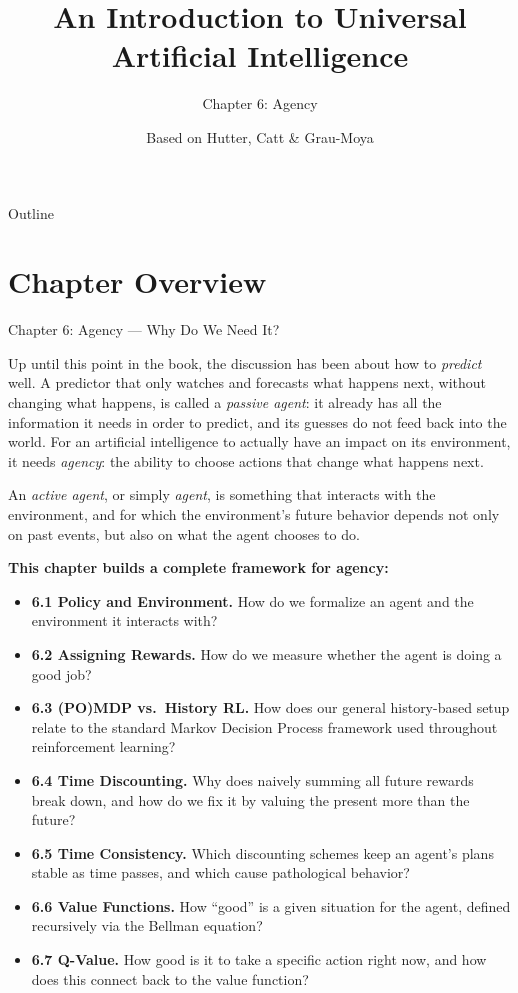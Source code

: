 \documentclass[aspectratio=169,10pt]{beamer}
\title[UAI -- Ch.6]{An Introduction to Universal Artificial Intelligence}
\subtitle{Chapter 6: Agency}
\author{Based on Hutter, Catt \& Grau-Moya}
\institute{CRC Press / Chapman \& Hall, 2024}
\date{}
\begin{document}
\begin{frame}
  \titlepage
\end{frame}

\begin{frame}{Outline}
  \tableofcontents
\end{frame}

\section{Chapter Overview}

\begin{frame}[allowframebreaks]{Chapter 6: Agency --- Why Do We Need It?}

Up until this point in the book, the discussion has been about how to
\emph{predict} well. A predictor that only watches and forecasts what
happens next, without changing what happens, is called a \emph{passive
agent}: it already has all the information it needs in order to predict,
and its guesses do not feed back into the world. For an artificial
intelligence to actually have an impact on its environment, it needs
\emph{agency}: the ability to choose actions that change what happens next.

\vspace{0.3cm}
An \emph{active agent}, or simply \emph{agent}, is something that
interacts with the environment, and for which the environment's future
behavior depends not only on past events, but also on what the agent
chooses to do.

\vspace{0.3cm}
\textbf{This chapter builds a complete framework for agency:}
\begin{itemize}
  \item \textbf{6.1 Policy and Environment.} How do we formalize an agent
    and the environment it interacts with?
  \item \textbf{6.2 Assigning Rewards.} How do we measure whether the agent
    is doing a good job?
  \item \textbf{6.3 (PO)MDP vs.\ History RL.} How does our general
    history-based setup relate to the standard Markov Decision Process
    framework used throughout reinforcement learning?
  \item \textbf{6.4 Time Discounting.} Why does naively summing all future
    rewards break down, and how do we fix it by valuing the present more
    than the future?
  \item \textbf{6.5 Time Consistency.} Which discounting schemes keep an
    agent's plans stable as time passes, and which cause pathological
    behavior?
  \item \textbf{6.6 Value Functions.} How ``good'' is a given situation for
    the agent, defined recursively via the Bellman equation?
  \item \textbf{6.7 Q-Value.} How good is it to take a specific action right
    now, and how does this connect back to the value function?
\end{itemize}


\end{frame}
\end{document}

